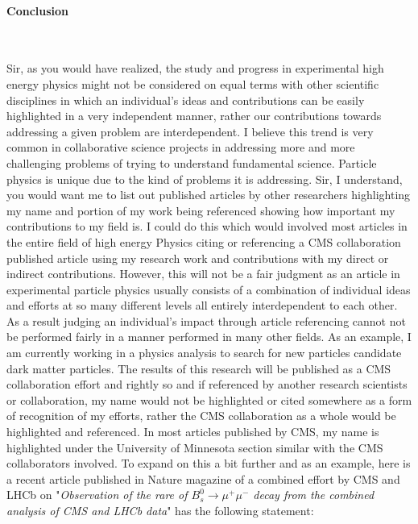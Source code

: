 \documentclass[12pt]{article}
\begin{document}
\paragraph{Conclusion}\mbox{}\\
\par
Sir, as you would have realized, the study and progress in experimental high energy physics might not be considered on equal terms with other scientific disciplines in which an individual's ideas and contributions can be easily highlighted in a very independent manner, rather our contributions towards addressing a given problem are interdependent. I believe this trend is very common in collaborative science projects in addressing more and more challenging problems of trying to understand fundamental science. 
Particle physics is unique due to the kind of problems it is addressing.
Sir, I understand, you would want me to list out published articles by other researchers highlighting my name and portion of my work being referenced showing how important my contributions to my field is. I could do this which would involved most articles in the entire field of high energy Physics citing or referencing a CMS collaboration published article using my research work and contributions with my direct or indirect contributions. However, this will not be a fair judgment as an article in experimental particle physics usually consists of a combination of individual ideas and efforts at so many different levels all entirely interdependent to each other. As a result judging an individual's impact through article referencing cannot not be performed fairly in a manner performed in many other fields. As an example, I am currently working in a physics analysis to search for new particles candidate dark matter particles. The results of this research will be published as a CMS collaboration effort and rightly so and if referenced by another research scientists or collaboration, my name would not be highlighted or cited somewhere as a form of recognition of my efforts, rather the CMS collaboration as a whole would be highlighted and referenced.  In most articles published by CMS, my name is highlighted under the University of Minnesota section similar with the CMS collaborators involved. To expand on this a bit further and as an example, here is a recent article published in Nature magazine of a combined effort by CMS and LHCb on "\textit{Observation of the rare of $B^{0}_{s} \rightarrow \mu^{+} \mu^{-}$ decay from the combined analysis of CMS and LHCb data}" has the following statement: 
\newline
\end{document}
